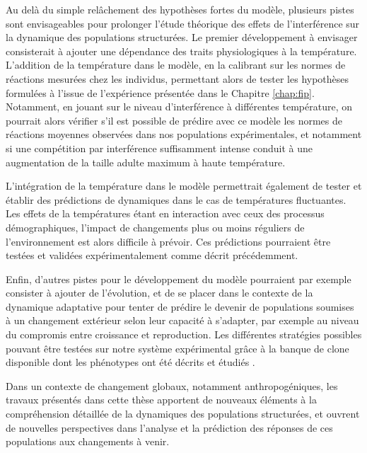 Au delà du simple relâchement des hypothèses fortes du modèle, plusieurs pistes
sont envisageables pour prolonger l'étude théorique des effets de l'interférence
sur la dynamique des populations structurées. Le premier développement à
envisager consisterait à ajouter une dépendance des traits physiologiques à la
température. L'addition de la température dans le modèle, en la calibrant sur
les normes de réactions mesurées chez les individus, permettant alors de tester
les hypothèses formulées à l'issue de l'expérience présentée dans le Chapitre
\ref{chap:fip}. Notamment, en jouant sur le niveau d'interférence à différentes
température, on pourrait alors vérifier s'il est possible de prédire avec ce
modèle les normes de réactions moyennes observées dans nos populations
expérimentales, et notamment si une compétition par interférence
suffisamment intense conduit à une augmentation de la taille adulte maximum à
haute température. 

L'intégration de la température dans le modèle permettrait également de tester
et établir des prédictions de dynamiques dans le cas de températures
fluctuantes. Les effets de la températures étant en interaction avec ceux des
processus démographiques, l'impact de changements plus ou moins réguliers de
l'environnement est alors difficile à prévoir. Ces prédictions pourraient être
testées et validées expérimentalement comme décrit précédemment. 

Enfin, d'autres pistes pour le développement du modèle pourraient par exemple
consister à ajouter de l'évolution, et de se placer dans le contexte de la
dynamique adaptative pour tenter de prédire le devenir de populations soumises à
un changement extérieur selon leur capacité à s'adapter, par exemple au niveau
du compromis entre croissance et reproduction. Les différentes stratégies
possibles pouvant être testées sur notre système expérimental grâce à la banque
de clone disponible dont les phénotypes ont été décrits et étudiés
\autocites{tully2004a}.

Dans un contexte de changement globaux, notamment anthropogéniques, les travaux
présentés dans cette thèse apportent de nouveaux éléments à la compréhension
détaillée de la dynamiques des populations structurées, et ouvrent de nouvelles
perspectives dans l'analyse et la prédiction des réponses de ces populations aux
changements à venir.
